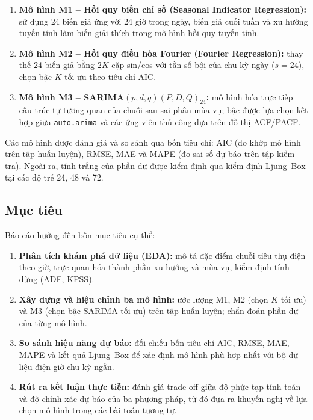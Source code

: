 \documentclass[12pt, a4paper]{article}
\theoremstyle{definition}
\begin{document}
\begin{enumerate}[leftmargin=2em]
  \item \textbf{Mô hình M1 -- Hồi quy biến chỉ số (Seasonal Indicator Regression):}
    sử dụng 24 biến giả ứng với 24 giờ trong ngày, biến giả cuối tuần và xu hướng tuyến tính làm biến giải thích trong mô hình hồi quy tuyến tính.

  \item \textbf{Mô hình M2 -- Hồi quy điều hòa Fourier (Fourier Regression):}
    thay thế 24 biến giả bằng $2K$ cặp sin/cos với tần số bội của chu kỳ ngày ($s = 24$), chọn bậc $K$ tối ưu theo tiêu chí AIC.

  \item \textbf{Mô hình M3 -- SARIMA$(p,d,q)(P,D,Q)_{24}$:}
    mô hình hóa trực tiếp cấu trúc tự tương quan của chuỗi sau sai phân mùa vụ; bậc được lựa chọn kết hợp giữa \texttt{auto.arima} và các ứng viên thủ công dựa trên đồ thị ACF/PACF.
\end{enumerate}

Các mô hình được đánh giá và so sánh qua bốn tiêu chí: AIC (đo khớp mô hình trên tập huấn luyện), RMSE, MAE và MAPE (đo sai số dự báo trên tập kiểm tra).
Ngoài ra, tính trắng của phần dư được kiểm định qua kiểm định Ljung--Box tại các độ trễ 24, 48 và 72.

\subsection{Mục tiêu}

Báo cáo hướng đến bốn mục tiêu cụ thể:

\begin{enumerate}[leftmargin=2em]
  \item \textbf{Phân tích khám phá dữ liệu (EDA):} mô tả đặc điểm chuỗi tiêu thụ điện theo giờ, trực quan hóa thành phần xu hướng và mùa vụ, kiểm định tính dừng (ADF, KPSS).

  \item \textbf{Xây dựng và hiệu chỉnh ba mô hình:} ước lượng M1, M2 (chọn $K$ tối ưu) và M3 (chọn bậc SARIMA tối ưu) trên tập huấn luyện; chẩn đoán phần dư của từng mô hình.

  \item \textbf{So sánh hiệu năng dự báo:} đối chiếu bốn tiêu chí AIC, RMSE, MAE, MAPE và kết quả Ljung--Box để xác định mô hình phù hợp nhất với bộ dữ liệu điện giờ chu kỳ ngắn.

  \item \textbf{Rút ra kết luận thực tiễn:} đánh giá trade-off giữa độ phức tạp tính toán và độ chính xác dự báo của ba phương pháp, từ đó đưa ra khuyến nghị về lựa chọn mô hình trong các bài toán tương tự.
\end{enumerate}
\end{document}
